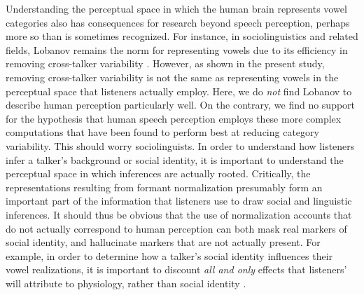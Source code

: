 \documentclass[preprint]{JASA}
\begin{document}
Understanding the perceptual space in which the human brain represents vowel categories also has consequences for research beyond speech perception, perhaps more so than is sometimes recognized. For instance, in sociolinguistics and related fields, Lobanov remains the norm for representing vowels due to its efficiency in removing cross-talker variability \citep[for review, see][]{adank2004, barreda2021}. However, as shown in the present study, removing cross-talker variability is not the same as representing vowels in the perceptual space that listeners actually employ. Here, we do \emph{not} find Lobanov to describe human perception particularly well. On the contrary, we find no support for the hypothesis that human speech perception employs these more complex computations that have been found to perform best at reducing category variability. This should worry sociolinguists. In order to understand how listeners infer a talker's background or social identity, it is important to understand the perceptual space in which inferences are actually rooted. Critically, the representations resulting from formant normalization presumably form an important part of the information that listeners use to draw social and linguistic inferences. It should thus be obvious that the use of normalization accounts that do not actually correspond to human perception can both mask real markers of social identity, and hallucinate markers that are not actually present. For example, in order to determine how a talker's social identity influences their vowel realizations, it is important to discount \emph{all and only} effects that listeners' will attribute to physiology, rather than social identity \citep{disner1980, hindle1978}.
\end{document}
